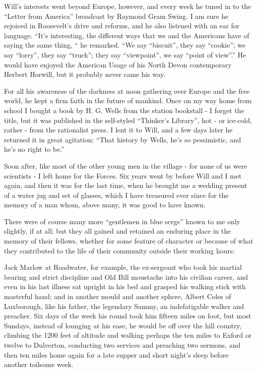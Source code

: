 Will’s interests went beyond Europe, however, and every week he tuned in to the “Letter from America” broadcast by Raymond Gram Swing. I am sure he rejoiced in Roosevelt’s drive and reforms, and he also listened with an ear for language. “It’s interesting, the different ways that we and the Americans have of saying the same thing, “ he remarked. “We say “biscuit”, they say “cookie”; we say “lorry”, they say “truck”; they say “viewpoint”, we say “point of view”.” He would have enjoyed the American Usage of his North Devon contemporary Herbert Horwill, but it probably never came his way.

For all his awareness of the darkness at noon gathering over Europe and the free world, he kept a firm faith in the future of mankind. Once on my way home from school I bought a book by H. G. Wells from the station bookstall - I forget the title, but it was published in the self-styled “Thinker’s Library”, hot - or ice-cold, rather - from the rationalist press. I lent it to Will, and a few days later he returned it in great agitation: “That history by Wells, he’s so pessimistic, and he’s no right to be.”

Soon after, like most of the other young men in the village - for none of us were scientists - I left home for the Forces. Six years went by before Will and I met again, and then it was for the last time, when he brought me a wedding present of a water jug and set of glasses, which I have treasured ever since for the memory of a man whom, above many, it was good to have known.

There were of course many more “gentlemen in blue serge” known to me only slightly, if at all; but they all gained and retained an enduring place in the memory of their fellows, whether for some feature of character or because of what they contributed to the life of their community outside their working hours:
 
Jack Marlow at Roadwater, for example, the ex-sergeant who took his martial bearing and strict discipline and Old Bill moustache into his civilian career, and even in his last illness sat upright in his bed and grasped his walking stick with masterful hand; and in another mould and another sphere, Albert Coles of Luxborough, like his father, the legendary Sammy, an indefatigable walker and preacher. Six days of the week his round took him fifteen miles on foot, but most Sundays, instead of lounging at his ease, he would be off over the hill country, climbing the 1200 feet of altitude and walking perhaps the ten miles to Exford or twelve to Dulverton, conducting two services and preaching two sermons, and then ten miles home again for a late supper and short night’s sleep before another toilsome week.

